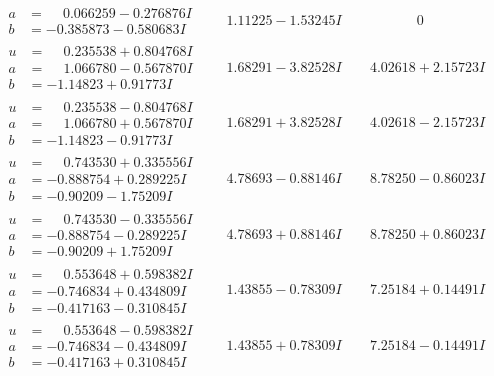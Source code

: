 \documentclass[1p]{elsarticle_modified}
\theoremstyle{definition}
\begin{document}
$$\begin{array}{c|c|c}
\begin{aligned}
a &= \phantom{-}0.066259 - 0.276876 I \\
b &= -0.385873 - 0.580683 I\end{aligned}
 & \phantom{-}1.11225 - 1.53245 I & \phantom{-0.000000 } 0 \\ \hline\begin{aligned}
u &= \phantom{-}0.235538 + 0.804768 I \\
a &= \phantom{-}1.066780 - 0.567870 I \\
b &= -1.14823 + 0.91773 I\end{aligned}
 & \phantom{-}1.68291 - 3.82528 I & \phantom{-}4.02618 + 2.15723 I \\ \hline\begin{aligned}
u &= \phantom{-}0.235538 - 0.804768 I \\
a &= \phantom{-}1.066780 + 0.567870 I \\
b &= -1.14823 - 0.91773 I\end{aligned}
 & \phantom{-}1.68291 + 3.82528 I & \phantom{-}4.02618 - 2.15723 I \\ \hline\begin{aligned}
u &= \phantom{-}0.743530 + 0.335556 I \\
a &= -0.888754 + 0.289225 I \\
b &= -0.90209 - 1.75209 I\end{aligned}
 & \phantom{-}4.78693 - 0.88146 I & \phantom{-}8.78250 - 0.86023 I \\ \hline\begin{aligned}
u &= \phantom{-}0.743530 - 0.335556 I \\
a &= -0.888754 - 0.289225 I \\
b &= -0.90209 + 1.75209 I\end{aligned}
 & \phantom{-}4.78693 + 0.88146 I & \phantom{-}8.78250 + 0.86023 I \\ \hline\begin{aligned}
u &= \phantom{-}0.553648 + 0.598382 I \\
a &= -0.746834 + 0.434809 I \\
b &= -0.417163 - 0.310845 I\end{aligned}
 & \phantom{-}1.43855 - 0.78309 I & \phantom{-}7.25184 + 0.14491 I \\ \hline\begin{aligned}
u &= \phantom{-}0.553648 - 0.598382 I \\
a &= -0.746834 - 0.434809 I \\
b &= -0.417163 + 0.310845 I\end{aligned}
 & \phantom{-}1.43855 + 0.78309 I & \phantom{-}7.25184 - 0.14491 I \\ \hline\begin{aligned}

\end{aligned}
\end{array}$$
\end{document}
